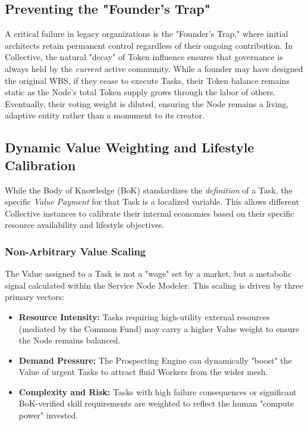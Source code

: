 \subsection{Preventing the "Founder’s Trap"}
A critical failure in legacy organizations is the "Founder’s Trap," where initial architects retain permanent control regardless of their ongoing contribution. In Collective, the natural "decay" of Token influence ensures that governance is always held by the \textit{current} active community. While a founder may have designed the original WBS, if they cease to execute Tasks, their Token balance remains static as the Node's total Token supply grows through the labor of others. Eventually, their voting weight is diluted, ensuring the Node remains a living, adaptive entity rather than a monument to its creator.

\subsection{Dynamic Value Weighting and Lifestyle Calibration}
While the Body of Knowledge (BoK) standardizes the \textit{definition} of a Task, the specific \textit{Value Payment} for that Task is a localized variable. This allows different Collective instances to calibrate their internal economies based on their specific resource availability and lifestyle objectives.

\subsubsection{Non-Arbitrary Value Scaling}
The Value assigned to a Task is not a "wage" set by a market, but a metabolic signal calculated within the Service Node Modeler. This scaling is driven by three primary vectors:
\begin{itemize}[leftmargin=*]
    \item \textbf{Resource Intensity:} Tasks requiring high-utility external resources (mediated by the Common Fund) may carry a higher Value weight to ensure the Node remains balanced.
    \item \textbf{Demand Pressure:} The Prospecting Engine can dynamically "boost" the Value of urgent Tasks to attract fluid Workers from the wider mesh.
    \item \textbf{Complexity and Risk:} Tasks with high failure consequences or significant BoK-verified skill requirements are weighted to reflect the human "compute power" invested.
\end{itemize}

